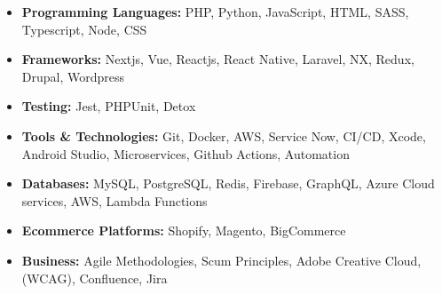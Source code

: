 \vspace{0.5cm}
\begin{itemize}
    \item \textbf{Programming Languages:} PHP, Python, JavaScript, HTML, SASS, Typescript, Node, CSS
    \item \textbf{Frameworks:} Nextjs, Vue, Reactjs, React Native, Laravel, NX, Redux, Drupal, Wordpress
    \item \textbf{Testing:} Jest, PHPUnit, Detox
    \item \textbf{Tools \& Technologies:} Git, Docker, AWS, Service Now, CI/CD, Xcode, Android Studio, Microservices, Github Actions, Automation
    \item \textbf{Databases:} MySQL, PostgreSQL, Redis, Firebase, GraphQL, Azure Cloud services, AWS, Lambda Functions
    \item \textbf{Ecommerce Platforms:} Shopify, Magento, BigCommerce
    \item \textbf{Business:} Agile Methodologies, Scum Principles, Adobe Creative Cloud, (WCAG), Confluence, Jira
\end{itemize}

